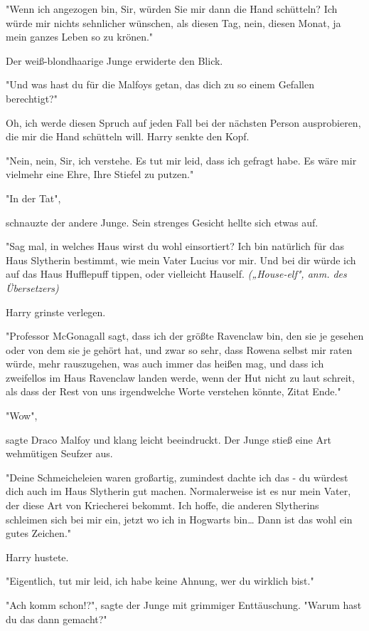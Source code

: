 {"Wenn ich angezogen bin, Sir, würden Sie mir dann die Hand schütteln? Ich würde mir nichts sehnlicher wünschen, als diesen Tag, nein, diesen Monat, ja mein ganzes Leben so zu krönen."

Der weiß-blondhaarige Junge erwiderte den Blick.

"Und was hast du für die Malfoys getan, das dich zu so einem Gefallen berechtigt?"

Oh, ich werde diesen Spruch auf jeden Fall bei der nächsten Person ausprobieren, die mir die Hand schütteln will. Harry senkte den Kopf.

"Nein, nein, Sir, ich verstehe. Es tut mir leid, dass ich gefragt habe. Es wäre mir vielmehr eine Ehre, Ihre Stiefel zu putzen."

"In der Tat",

schnauzte der andere Junge. Sein strenges Gesicht hellte sich etwas auf.

"Sag mal, in welches Haus wirst du wohl einsortiert? Ich bin natürlich für das Haus Slytherin bestimmt, wie mein Vater Lucius vor mir. Und bei dir würde ich auf das Haus Hufflepuff tippen, oder vielleicht Hauself. \emph{(„House-elf", anm. des Übersetzers)}

Harry grinste verlegen.

"Professor McGonagall sagt, dass ich der größte Ravenclaw bin, den sie je gesehen oder von dem sie je gehört hat, und zwar so sehr, dass Rowena selbst mir raten würde, mehr rauszugehen, was auch immer das heißen mag, und dass ich zweifellos im Haus Ravenclaw landen werde, wenn der Hut nicht zu laut schreit, als dass der Rest von uns irgendwelche Worte verstehen könnte, Zitat Ende."

"Wow",

sagte Draco Malfoy und klang leicht beeindruckt. Der Junge stieß eine Art wehmütigen Seufzer aus.

"Deine Schmeicheleien waren großartig, zumindest dachte ich das - du würdest dich auch im Haus Slytherin gut machen. Normalerweise ist es nur mein Vater, der diese Art von Kriecherei bekommt. Ich hoffe, die anderen Slytherins schleimen sich bei mir ein, jetzt wo ich in Hogwarts bin… Dann ist das wohl ein gutes Zeichen."

Harry hustete.

"Eigentlich, tut mir leid, ich habe keine Ahnung, wer du wirklich bist."

"Ach komm schon!?", sagte der Junge mit grimmiger Enttäuschung. "Warum hast du das dann gemacht?"

}
